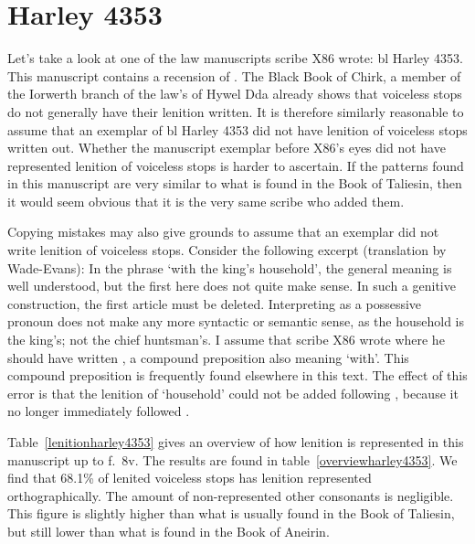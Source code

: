 


\section{Harley 4353}
Let's take a look at one of the law manuscripts scribe X86 wrote: \gls{bl} Harley 4353. This manuscript contains a recension of . The Black Book of Chirk, a member of the Iorwerth branch of the law's of Hywel Dda already shows that voiceless stops do not generally have their lenition written. It is therefore similarly reasonable to assume that an exemplar of \gls{bl} Harley 4353 did not have lenition of voiceless stops written out. Whether the manuscript exemplar before X86's eyes did not have represented lenition of voiceless stops is harder to ascertain. If the patterns found in this manuscript are very similar to what is found in the Book of Taliesin, then it would seem obvious that it is the very same scribe who added them. 

Copying mistakes may also give grounds to assume that an exemplar did not write lenition of voiceless stops. Consider the following excerpt (translation by Wade-Evans):
In the phrase  `with the king's household', the general meaning is well understood, but the first  here does not quite make sense. In such a genitive construction, the first article must be deleted. Interpreting  as a possessive pronoun does not make any more syntactic or semantic sense, as the household is the king's; not the chief huntsman's. I assume that scribe X86 wrote  where he should have written , a compound preposition also meaning `with'. This compound preposition is frequently found elsewhere in this text. The effect of this error is that the lenition of  `household' could not be added following , because it no longer immediately followed .

Table~\ref{lenitionharley4353} gives an overview of how lenition is represented in this manuscript up to f.\ 8v. The results are found in table~\ref{overviewharley4353}. We find that 68.1\% of lenited voiceless stops has lenition represented orthographically. The amount of non-represented other consonants is negligible. This figure is slightly higher than what is usually found in the Book of Taliesin, but still lower than what is found in the Book of Aneirin. 

